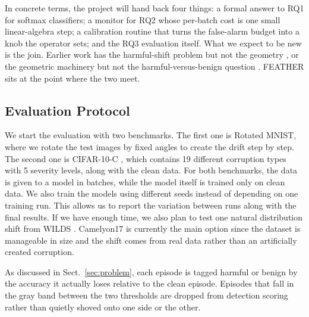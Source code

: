 \documentclass[graybox]{SNmult}
\begin{document}
In concrete terms, the project will hand back four things: a formal
answer to RQ1 for softmax classifiers; a monitor for RQ2 whose per-batch
cost is one small linear-algebra step; a calibration routine that turns
the false-alarm budget into a knob the operator sets; and the RQ3
evaluation itself. What we expect to be new is the join. Earlier work
has the harmful-shift problem but not the geometry
\cite{amoukou2024sequential}, or the geometric machinery but not the
harmful-versus-benign question \cite{zhang2023score, pandey2025zdp}.
FEATHER sits at the point where the two meet.

\subsection{Evaluation Protocol}
\label{sec:protocol}

 We start the evaluation with two benchmarks. The first one is Rotated MNIST, where we rotate the test images by fixed angles to create the drift step by step. The second one is CIFAR-10-C 
\cite{hendrycks2019benchmarking}, which contains 19 different corruption types with 5 severity levels, along with the clean data. For both benchmarks, the data is given to a model in batches, while the model itself is trained only on clean data. We also train the models using different seeds instead of depending on one training run. This allows us to report the variation between runs along with the final results. If we have enough time, we also plan to test one natural distribution shift from WILDS \cite{koh2021wilds}. Camelyon17 is currently the main option since the dataset is manageable in size and the shift comes from real data rather than an artificially created corruption.


 As discussed in
Sect.~\ref{sec:problem}, each episode is tagged harmful or benign by the
accuracy it actually loses relative to the clean episode. Episodes that
fall in the gray band between the two thresholds are dropped from
detection scoring rather than quietly shoved onto one side or the other.
\end{document}
